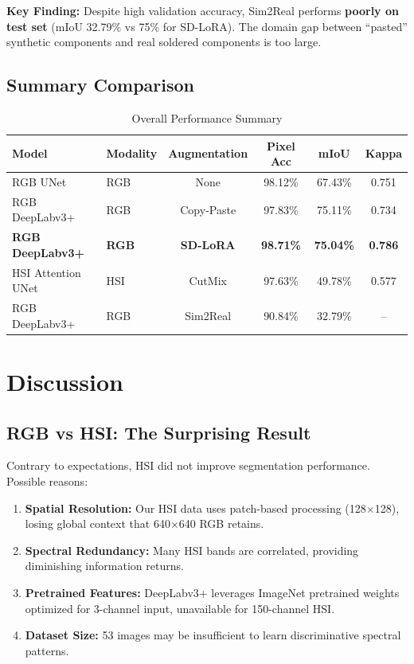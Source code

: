 \documentclass[12pt,a4paper]{article}
\begin{document}
\textbf{Key Finding:} Despite high validation accuracy, Sim2Real performs \textbf{poorly on test set} (mIoU 32.79\% vs 75\% for SD-LoRA). The domain gap between ``pasted'' synthetic components and real soldered components is too large.

\subsection{Summary Comparison}

\begin{table}[H]
\centering
\caption{Overall Performance Summary}
\label{tab:summary}
\begin{tabular}{llcccc}
\toprule
\textbf{Model} & \textbf{Modality} & \textbf{Augmentation} & \textbf{Pixel Acc} & \textbf{mIoU} & \textbf{Kappa} \\
\midrule
RGB UNet & RGB & None & 98.12\% & 67.43\% & 0.751 \\
RGB DeepLabv3+ & RGB & Copy-Paste & 97.83\% & 75.11\% & 0.734 \\
\rowcolor{green!15} \textbf{RGB DeepLabv3+} & \textbf{RGB} & \textbf{SD-LoRA} & \textbf{98.71\%} & \textbf{75.04\%} & \textbf{0.786} \\
HSI Attention UNet & HSI & CutMix & 97.63\% & 49.78\% & 0.577 \\
RGB DeepLabv3+ & RGB & Sim2Real & 90.84\% & 32.79\% & -- \\
\bottomrule
\end{tabular}
\end{table}

\section{Discussion}

\subsection{RGB vs HSI: The Surprising Result}

Contrary to expectations, HSI did not improve segmentation performance. Possible reasons:
\begin{enumerate}
    \item \textbf{Spatial Resolution:} Our HSI data uses patch-based processing (128$\times$128), losing global context that 640$\times$640 RGB retains.
    \item \textbf{Spectral Redundancy:} Many HSI bands are correlated, providing diminishing information returns.
    \item \textbf{Pretrained Features:} DeepLabv3+ leverages ImageNet pretrained weights optimized for 3-channel input, unavailable for 150-channel HSI.
    \item \textbf{Dataset Size:} 53 images may be insufficient to learn discriminative spectral patterns.
\end{enumerate}
\end{document}
